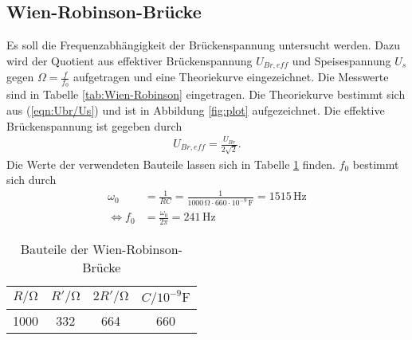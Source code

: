 \subsection{Wien-Robinson-Brücke}
Es soll die Frequenzabhängigkeit der Brückenspannung untersucht werden. Dazu wird der Quotient aus effektiver Brückenspannung $U_{Br,eff}$ und Speisespannung $U_s$
gegen $\Omega = \frac{f}{f_0}$ aufgetragen und eine Theoriekurve eingezeichnet. Die Messwerte sind in Tabelle \ref{tab:Wien-Robinson} eingetragen.
Die Theoriekurve bestimmt sich aus (\ref{eqn:Ubr/Us}) und ist in Abbildung \ref{fig:plot} aufgezeichnet. Die effektive Brückenspannung ist gegeben durch
\begin{align*}
  U_{Br,eff} = \frac{U_{Br}}{2\sqrt{2}}.
\end{align*}
Die Werte der verwendeten Bauteile lassen sich in Tabelle \ref{tab:Bauteile} finden. $f_0$ bestimmt sich durch
\begin{align*}
  \omega_0 &= \frac{1}{RC} = \frac{1}{1000\,\unit{\ohm}\cdot 660 \cdot 10^{-9} \,\unit{\farad}} = 1515\,\unit{\hertz} \\
  \iff f_0 &= \frac{\omega_0}{2\pi} = 241\,\unit{\hertz}
\end{align*}

\begin{table}
  \centering
  \caption{Bauteile der Wien-Robinson-Brücke}
  \label{tab:Bauteile}
  \begin{tabular}{c c c c}
    \toprule
    $R/\unit{\ohm}$ & $R'/\unit{\ohm}$ & $2R'/\unit{\ohm}$ & $C/10^{-9}\unit{\farad}$ \\
    \midrule
    1000 & 332 & 664 & 660 \\
    \bottomrule
  \end{tabular}
\end{table}

